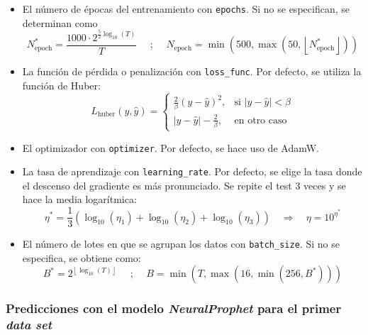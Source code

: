 \documentclass[12pt,twoside]{article}
\begin{document}
\begin{itemize}
    \item El número de épocas del entrenamiento con \texttt{epochs}. Si no se especifican, se determinan como 
    \begin{equation}
    N_{\text{epoch}}^* = \frac{1000 \cdot 2^{\frac{5}{2} \log_{10}(T)}}{T}
    \quad \text{ ; } \quad
    N_{\text{epoch}} = \min\left( 500, \max\left( 50, \left\lfloor N_{\text{epoch}}^* \right\rfloor \right) \right)
    \end{equation}
    \item La función de pérdida o penalización con \texttt{loss\_func}. Por defecto, se utiliza la función de Huber: 
    \begin{equation}
    L_{\text{huber}}(y, \hat{y}) =
    \begin{cases}
    \frac{2}{\beta} (y - \hat{y})^2, & \text{si } |y - \hat{y}| < \beta \\
    |y - \hat{y}| - \frac{2}{\beta}, & \text{en otro caso}
    \end{cases}
    \end{equation}
    \item El optimizador con \texttt{optimizer}. Por defecto, se hace uso de AdamW.
    \item La tasa de aprendizaje con \texttt{learning\_rate}. Por defecto, se elige la tasa donde el descenso del gradiente es más pronunciado. Se repite el test 3 veces y se hace la media logarítmica: 
    \begin{equation}
    \eta^* = \frac{1}{3} \left( \log_{10}(\eta_1) + \log_{10}(\eta_2) + \log_{10}(\eta_3) \right) \quad \Rightarrow \quad \eta = 10^{\eta^*}
    \end{equation}
    \item El número de lotes en que se agrupan los datos con \texttt{batch\_size}. Si no se especifica, se obtiene como: 
    \begin{equation}
    B^* = 2^{\left\lfloor \log_{10}(T) \right\rfloor}
    \quad \text{ ; } \quad
    B = \min\left( T, \max\left( 16, \min\left( 256, B^* \right) \right) \right)
    \end{equation}
\end{itemize}


\subsubsection{Predicciones con el modelo \textit{NeuralProphet} para el primer \textit{data set}}\label{sec:32}
\end{document}
